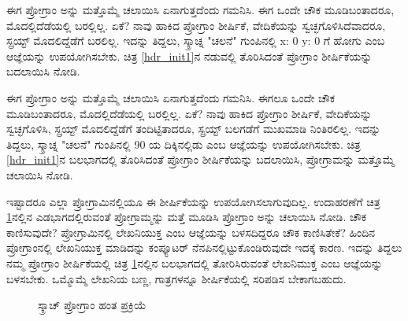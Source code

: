 ಈಗ ಪ್ರೋಗ್ರಾಂ ಅನ್ನು  ಮತ್ತೊಮ್ಮೆ ಚಲಾಯಿಸಿ ಏನಾಗುತ್ತದೆಂದು ಗಮನಿಸಿ. ಈಗ ಒಂದೇ ಚೌಕ ಮೂಡಿಬಂತಾದರೂ,  ಮೊದಲ್ಲಿದೆಡೆಯಲ್ಲಿ ಬರಲ್ಲಿಲ್ಲ.  ಏಕೆ? ನಾವು ಹಾಕಿದ ಪ್ರೋಗ್ರಾಂ ಶೀರ್ಷಿಕೆ, ವೇದಿಕೆಯನ್ನು ಸ್ವಚ್ಛಗೊಳಿಸಿದೆವಾದರೂ, ಸ್ಪ್ರಯ್ಟ್ ಮೊದಲಿದ್ದೆಡೆಗೆ ಬರಲಿಲ್ಲ. ಇದನ್ನು ತಿದ್ದಲು, ಸ್ಕ್ರಾಚ್ನ "ಚಲನೆ" ಗುಂಪಿನಲ್ಲಿ  \textenglish{x: 0 y: 0} ಗೆ ಹೋಗು ಎಂಬ ಆಜ್ಞೆಯನ್ನು ಉಪಯೋಗಿಸಬೇಕು.  ಚಿತ್ರ \ref{hdr_init1}ನ ನಡುವಲ್ಲಿ ತೊರಿಸಿದಂತೆ  ಪ್ರೋಗ್ರಾಂ ಶೀರ್ಷಿಕೆಯನ್ನು ಬದಲಾಯಿಸಿ ನೋಡಿ. 

ಈಗ ಪ್ರೋಗ್ರಾಂ ಅನ್ನು  ಮತ್ತೊಮ್ಮೆ ಚಲಾಯಿಸಿ ಏನಾಗುತ್ತದೆಂದು ಗಮನಿಸಿ. ಈಗಲೂ ಒಂದೇ ಚೌಕ ಮೂಡಿಬಂತಾದರೂ,  ಮೊದಲ್ಲಿದೆಡೆಯಲ್ಲಿ ಬರಲ್ಲಿಲ್ಲ.  ಏಕೆ? ನಾವು ಹಾಕಿದ ಪ್ರೋಗ್ರಾಂ ಶೀರ್ಷಿಕೆ, ವೇದಿಕೆಯನ್ನು ಸ್ವಚ್ಛಗೊಳಿಸಿ, ಸ್ಪ್ರಯ್ಟ್ ಮೊದಲಿದ್ದೆಡೆಗೆ ತಂದಿಟ್ಟಿತಾದರೂ,  ಸ್ಪ್ರಯ್ಟ್ ಬಲಗಡೆಗೆ ಮುಖಮಾಡಿ ನಿಂತಿರಲಿಲ್ಲ. ಇದನ್ನು ತಿದ್ದಲು, ಸ್ಕ್ರಾಚ್ನ "ಚಲನೆ" ಗುಂಪಿನಲ್ಲಿ  \textenglish{90} ಯ ದಿಕ್ಕಿನಲ್ಲಿಡು ಎಂಬ ಆಜ್ಞೆಯನ್ನು ಉಪಯೋಗಿಸಬೇಕು.  ಚಿತ್ರ \ref{hdr_init1}ನ ಬಲಭಾಗದಲ್ಲಿ ತೊರಿಸಿದಂತೆ  ಪ್ರೋಗ್ರಾಂ ಶೀರ್ಷಿಕೆಯನ್ನು ಬದಲಾಯಿಸಿ, ಪ್ರೋಗ್ರಾಮನ್ನು  ಮತ್ತೊಮ್ಮೆ ಚಲಾಯಿಸಿ ನೋಡಿ. 

ಇಷ್ಟಾದರೂ ಎಲ್ಲಾ ಪ್ರೋಗ್ರಾಮಿನಲ್ಲಿಯೂ ಈ ಶೀರ್ಷಿಕೆಯನ್ನು ಉಪಯೋಗಿಸಲಾಗುವುದಿಲ್ಲ.  ಉದಾಹರಣೆಗೆ ಚಿತ್ರ \ref{hdr_diff}ನಲ್ಲಿನ ಎಡಭಾಗದಲ್ಲಿರುವಂತೆ ಪ್ರೋಗ್ರಾಮ್ಮನ್ನು ಮತ್ತೆ ಮೂಡಿಸಿ ಪ್ರೋಗ್ರಾಂ ಅನ್ನು  ಚಲಾಯಿಸಿ ನೋಡಿ.  ಚೌಕ ಕಾಣಿಸುವುದೇ? ಪ್ರೋಗ್ರಾಮಿನಲ್ಲಿ ಲೇಖನಿಯುಕ್ತ ಎಂಬ ಆಜ್ಞೆಯನ್ನು ಬಳಸದಿದ್ದರೂ ಚೌಕ ಕಾಣಿಸಿತೇಕೆ? ಹಿಂದಿನ ಪ್ರೋಗ್ರಾಂನಲ್ಲಿ ಲೇಖನಿಯುಕ್ತ ಮಾಡಿದನ್ನು ಕಂಪ್ಯೂಟರ್ ನೆನಪಿನಲ್ಲಿಟ್ಟುಕೊಂಡಿರುವುದೇ ಇದಕ್ಕೆ ಕಾರಣ.  ಇದನ್ನು ತಿದ್ದಲು ನಮ್ಮ ಪ್ರೋಗ್ರಾಂ ಶೀರ್ಷಿಕೆಯಲ್ಲಿ ಚಿತ್ರ \ref{hdr_diff}ನಲ್ಲಿನ ಬಲಭಾಗದಲ್ಲಿ ತೋರಿಸಿರುವಂತೆ ಲೇಖನಿಮುಕ್ತ ಎಂಬ ಆಜ್ಞೆಯನ್ನು ಬಳಸಬೇಕು. ಒಮ್ಮೊಮ್ಮೆ ಲೇಖನಿಯ ಬಣ್ಣ, ಗಾತ್ರಗಳನ್ನೂ ಶೀರ್ಷಿಕೆಯಲ್ಲಿ ಸರಿಪಡಿಸ ಬೇಕಾಗಬಹುದು.

\begin{figure}[h]
\begin{multicols}{2}
\begin{center}
\begin{Scratch}[1]
\beginbox{}
\end{Scratch}

\begin{Scratch}[1]
\end{Scratch}
\end{center}
\end{multicols}
\caption{ಸ್ಕ್ರಾಚ್ ಪ್ರೋಗ್ರಾಂ ಹಂತ ಪ್ರಕ್ರಿಯೆ}
\label{hdr_diff}
\end{figure}

